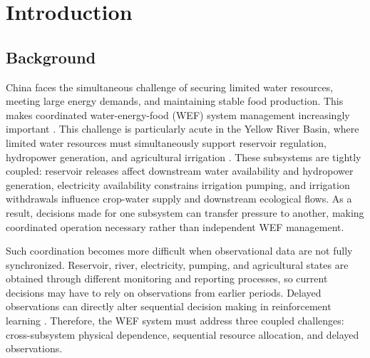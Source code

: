 \documentclass [a4paper,fleqn] {cas-dc}
\begin{document}
\section{Introduction} \label{sec1}
\subsection{Background} \label{sec11}

China faces the simultaneous challenge of securing limited water resources, meeting large energy demands, and maintaining stable food production. This makes coordinated water-energy-food (WEF) system management increasingly important \citep{hoff2011,bazilian2011,zhang2018concepts}. This challenge is particularly acute in the Yellow River Basin, where limited water resources must simultaneously support reservoir regulation, hydropower generation, and agricultural irrigation \citep{si2019,liu2019,Ren2022YellowRiverWEFC,Zhang2024YellowRiverWEFEfficiency}. These subsystems are tightly coupled: reservoir releases affect downstream water availability and hydropower generation, electricity availability constrains irrigation pumping, and irrigation withdrawals influence crop-water supply and downstream ecological flows. As a result, decisions made for one subsystem can transfer pressure to another, making coordinated operation necessary rather than independent WEF management.

Such coordination becomes more difficult when observational data are not fully synchronized. Reservoir, river, electricity, pumping, and agricultural states are obtained through different monitoring and reporting processes, so current decisions may have to rely on observations from earlier periods. Delayed observations can directly alter sequential decision making in reinforcement learning \citep{Agarwal2021DelayedObservations}. Therefore, the WEF system must address three coupled challenges: cross-subsystem physical dependence, sequential resource allocation, and delayed observations.
\end{document}
